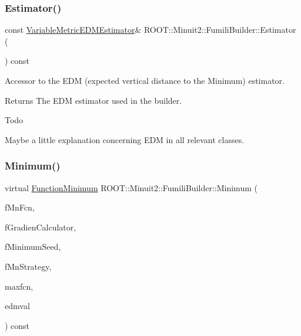 \subsubsection{\texorpdfstring{Estimator()}{Estimator()}\hspace{0.1cm}{\footnotesize\ttfamily [2/2]}}
{\footnotesize\ttfamily const \mbox{\hyperlink{classROOT_1_1Minuit2_1_1VariableMetricEDMEstimator}{Variable\+Metric\+E\+D\+M\+Estimator}}\& R\+O\+O\+T\+::\+Minuit2\+::\+Fumili\+Builder\+::\+Estimator (\begin{DoxyParamCaption}{ }\end{DoxyParamCaption}) const\hspace{0.3cm}{\ttfamily [inline]}}

Accessor to the E\+DM (expected vertical distance to the Minimum) estimator.

\begin{DoxyReturn}{Returns}
The E\+DM estimator used in the builder.
\end{DoxyReturn}
\begin{DoxyRefDesc}{Todo}
\item[\mbox{\hyperlink{todo__todo000017}{Todo}}]Maybe a little explanation concerning E\+DM in all relevant classes.\end{DoxyRefDesc}
\mbox{\label{classROOT_1_1Minuit2_1_1FumiliBuilder_aa1889039835b4117cb2a9b7d49e4f6dd}} 
\subsubsection{\texorpdfstring{Minimum()}{Minimum()}\hspace{0.1cm}{\footnotesize\ttfamily [1/4]}}
{\footnotesize\ttfamily virtual \mbox{\hyperlink{classROOT_1_1Minuit2_1_1FunctionMinimum}{Function\+Minimum}} R\+O\+O\+T\+::\+Minuit2\+::\+Fumili\+Builder\+::\+Minimum (\begin{DoxyParamCaption}\item[{const \mbox{\hyperlink{classROOT_1_1Minuit2_1_1MnFcn}{Mn\+Fcn}} \&}]{f\+Mn\+Fcn,  }\item[{const \mbox{\hyperlink{classROOT_1_1Minuit2_1_1GradientCalculator}{Gradient\+Calculator}} \&}]{f\+Gradien\+Calculator,  }\item[{const \mbox{\hyperlink{classROOT_1_1Minuit2_1_1MinimumSeed}{Minimum\+Seed}} \&}]{f\+Minimum\+Seed,  }\item[{const \mbox{\hyperlink{classROOT_1_1Minuit2_1_1MnStrategy}{Mn\+Strategy}} \&}]{f\+Mn\+Strategy,  }\item[{unsigned int}]{maxfcn,  }\item[{double}]{edmval }\end{DoxyParamCaption}) const\hspace{0.3cm}{\ttfamily [virtual]}}


